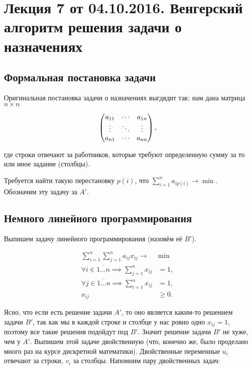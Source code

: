 
% 

\section{Лекция 7 от 04.10.2016. Венгерский алгоритм решения задачи о назначениях}

\subsection{Формальная постановка задачи}
Оригинальная постановка задачи о назначениях
выгдядит так: нам дана матрица $n \times n$

\[
  \begin{pmatrix}
    a_{11} & \cdots & a_{1n} \cr 
    \vdots & \ddots & \vdots \cr 
    a_{n1} & \cdots & a_{nn}
  \end{pmatrix},
\]

где строки отвечают за работников, которые требуют определенную сумму за то
или иное задание (столбцы).

Требуется найти такую перестановку $p(i)$, что $\sum\limits_{i = 1}^{n} 
a_{ip(i)} \to \min.$  Обозначим эту задачу за $A'$.

\subsection{Немного линейного программирования}

Выпишем задачу линейного программирования (назовём её $B'$).

\begin{align*}
  \sum\limits_{i = 1}^n \sum\limits_{j = 1}^n a_{ij}x_{ij} \to & \min\\
  \forall i \in \overline{1\ldots n} \implies \sum\limits_{j = 1}^n x_{ij} &= 1,\\
  \forall j \in \overline{1\ldots n} \implies \sum\limits_{i = 1}^n x_{ij} &= 1,\\
  x_{ij} &\geqslant 0.
\end{align*}

Ясно, что если есть решение задачи $A'$, то оно является каким-то решением задачи $B'$,
так как мы в каждой строке и столбце у нас ровно одно $x_{ij} = 1$, поэтому
все такие решения подойдут под $B'$. Значит решение задачи $B'$ не хуже, чем у
$A'$. Выпишем этой задаче двойственную (что, конечно же, было проделано
много раз на курсе дискретной математики). Двойственные переменные $u_i$ отвечают
за строки, $v_i$ за столбцы. Напомним пару двойственных задач:

